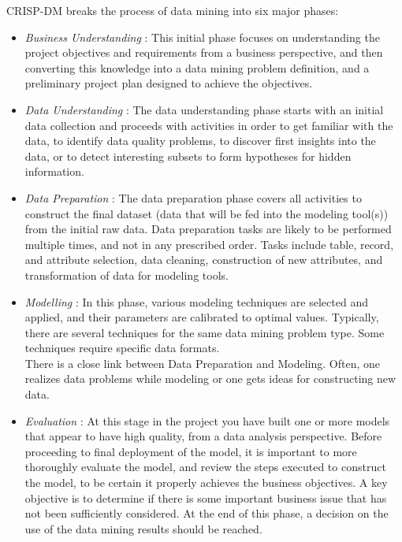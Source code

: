 \documentclass[12pt,a4paper,titlepage]{report}\usepackage{graphicx, color}
\begin{document}
CRISP-DM breaks the process of data mining into six major phases:
\begin{itemize}
  \item \emph{Business Understanding} : This initial phase focuses on understanding the project objectives and requirements from a
business perspective, and then converting this knowledge into a data mining problem
definition, and a preliminary project plan designed to achieve the objectives.

  \item \emph{Data Understanding} : The data understanding phase starts with an initial data collection and proceeds with activities in order to get familiar with the data, to identify data quality problems, to discover first insights into the data, or to detect interesting subsets to form hypotheses for hidden
information.

  \item \emph{Data Preparation} : The data preparation phase covers all activities to construct the final dataset (data that will be fed into the modeling tool(s)) from the initial raw data. Data preparation tasks are likely to be performed multiple times, and not in any prescribed order. Tasks include table, record, and
attribute selection, data cleaning, construction of new attributes, and transformation of data for modeling tools.

  \item \emph{Modelling} :
  In this phase, various modeling techniques are selected and applied, and their parameters are
calibrated to optimal values. Typically, there are several techniques for the same data mining
problem type. Some techniques require specific data formats.\\
There is a close link between Data Preparation and Modeling. Often, one realizes data
problems while modeling or one gets ideas for constructing new data.

  \item \emph{Evaluation} :
  At this stage in the project you have built one or more models that appear to have high quality,
from a data analysis perspective. Before proceeding to final deployment of the model, it is
important to more thoroughly evaluate the model, and review the steps executed to construct
the model, to be certain it properly achieves the business objectives. A key objective is to
determine if there is some important business issue that has not been sufficiently considered.
At the end of this phase, a decision on the use of the data mining results should be reached.


\end{itemize}
\end{document}
